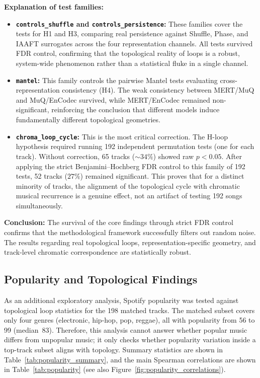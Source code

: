 \textbf{Explanation of test families:}
\begin{itemize}
    \item \textbf{\texttt{controls\_shuffle} and \texttt{controls\_persistence}:} These families cover the tests for H1 and H3, comparing real persistence against Shuffle, Phase, and IAAFT surrogates across the four representation channels. All tests survived FDR control, confirming that the topological reality of loops is a robust, system-wide phenomenon rather than a statistical fluke in a single channel.
    \item \textbf{\texttt{mantel}:} This family controls the pairwise Mantel tests evaluating cross-representation consistency (H4). The weak consistency between MERT/MuQ and MuQ/EnCodec survived, while MERT/EnCodec remained non-significant, reinforcing the conclusion that different models induce fundamentally different topological geometries.
    \item \textbf{\texttt{chroma\_loop\_cycle}:} This is the most critical correction. The H-loop hypothesis required running 192 independent permutation tests (one for each track). Without correction, 65 tracks (${\sim}34\%$) showed raw $p < 0.05$. After applying the strict Benjamini--Hochberg FDR control to this family of 192 tests, 52 tracks ($27\%$) remained significant. This proves that for a distinct minority of tracks, the alignment of the topological cycle with chromatic musical recurrence is a genuine effect, not an artifact of testing 192 songs simultaneously.
\end{itemize}

\textbf{Conclusion:} The survival of the core findings through strict FDR control confirms that the methodological framework successfully filters out random noise. The results regarding real topological loops, representation-specific geometry, and track-level chromatic correspondence are statistically robust.

\subsection{Popularity and Topological Findings}\label{ssec:popularity_results}

As an additional exploratory analysis, Spotify popularity was tested against topological loop statistics for the 198 matched tracks. The matched subset covers only four genres (electronic, hip-hop, pop, reggae), all with popularity from 56 to 99 (median~83). Therefore, this analysis cannot answer whether popular music differs from unpopular music; it only checks whether popularity variation inside a top-track subset aligns with topology. Summary statistics are shown in Table~\ref{tab:popularity_summary}, and the main Spearman correlations are shown in Table~\ref{tab:popularity} (see also Figure~\ref{fig:popularity_correlations}).

